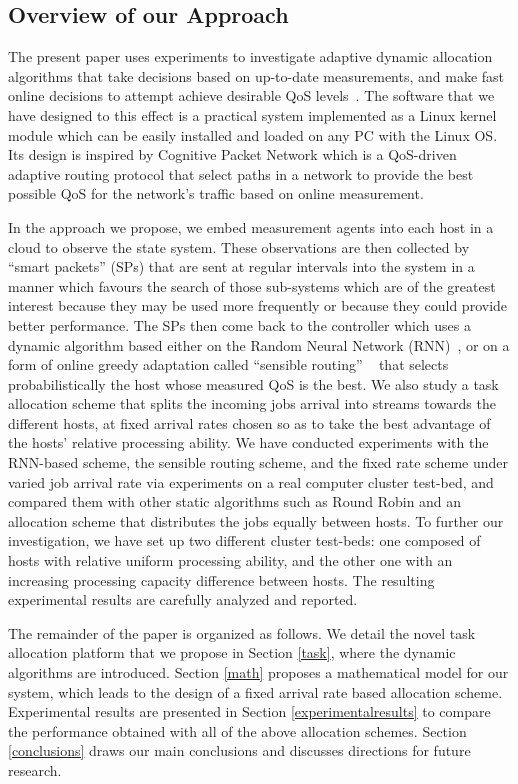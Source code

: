 \documentclass[journal]{IEEEtran}
\begin{document}
\subsection{Overview of our Approach}

The present paper uses experiments to investigate adaptive dynamic allocation algorithms that take decisions based on up-to-date measurements,
and make fast online decisions to attempt achieve desirable QoS levels~\cite{dillon2010cloud}. The software that we have designed to this effect is a practical system 
implemented as a Linux kernel module which can be easily installed and loaded on any PC with the Linux OS. Its design is inspired by Cognitive Packet Network \cite{SAN04} which is a QoS-driven adaptive routing protocol 
that select paths in a network to provide the best possible QoS for the network's traffic based on online measurement. 

In the approach we propose, we embed measurement agents into each host in a cloud to observe the state system. These observations are then collected by ``smart packets'' (SPs) that are sent at regular intervals 
into the system in a manner which favours the search of those sub-systems which are of the greatest
interest because they may be used more frequently or because they could provide better performance. The SPs then come back to the controller which uses a dynamic algorithm based either on the Random Neural Network (RNN)~\cite{SAN04,DBLP:journals/neco/GelenbeT08}, or on a form of online greedy adaptation called ``sensible routing'' ~\cite{gelenbe2003sensible} that selects probabilistically
the host whose measured QoS is the best.  We also study a task allocation scheme that splits the incoming jobs arrival into streams towards the different hosts, at fixed arrival rates 
chosen so as to take the best advantage of the hosts' relative processing ability. We have conducted experiments with the RNN-based scheme, the sensible routing scheme, and the fixed rate scheme under varied job arrival rate via experiments on a real computer cluster test-bed, and compared them with other static algorithms such as Round Robin and an allocation scheme that distributes the jobs equally between hosts. To further our investigation, we have set up two different cluster test-beds: one composed of hosts with relative uniform processing ability, and the other one with an increasing processing capacity difference between hosts. The resulting experimental results are carefully analyzed and reported.

The remainder of the paper is organized as follows. We detail the novel task allocation platform that we propose in Section \ref{task}, where the dynamic algorithms are introduced. Section \ref{math} proposes a mathematical model for our system, which leads to the design of a fixed arrival rate based allocation scheme. Experimental results are presented in Section \ref{experimentalresults} to  compare the performance obtained with all of the above allocation schemes. Section \ref{conclusions} draws our main conclusions and discusses directions
for future research. 
\end{document}
